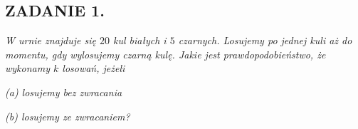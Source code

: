 \documentclass{article}
\begin{document}
\subsection*{ZADANIE 1.}
\emph{W urnie znajduje się $20$ kul białych i $5$ czarnych. Losujemy po jednej kuli aż do momentu, gdy wylosujemy czarną kulę. Jakie jest prawdopodobieństwo, że wykonamy $k$ losowań, jeżeli}

\emph{(a) losujemy bez zwracania}

\emph{(b) losujemy ze zwracaniem?}
\end{document}
